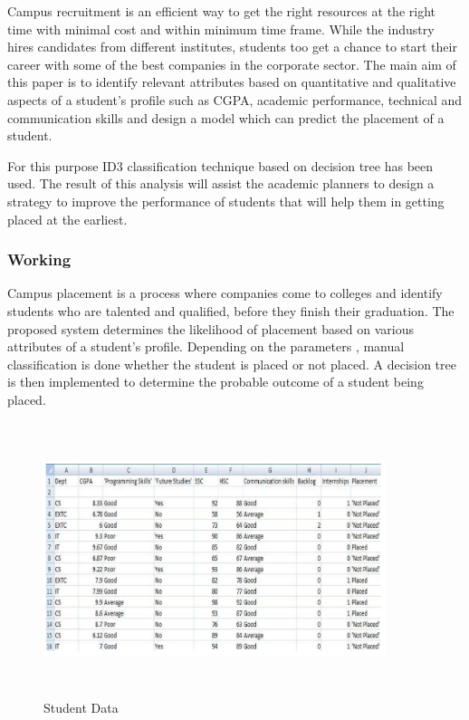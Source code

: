\documentclass[12pt]{article}
\begin{document}
Campus recruitment is an 
efficient way to get the right resources at the right time with 
minimal cost and within minimum time frame. While the 
industry hires candidates from different institutes, students 
too get a chance to start their career with some of the best 
companies in the corporate sector.
The main aim of this paper is to identify relevant attributes based on quantitative and 
qualitative aspects of a student's profile such as CGPA, 
academic performance, technical and communication skills 
and design a model which can predict the placement of a 
student. 

For this purpose ID3 classification technique based 
on decision tree has been used. The result of this analysis will 
assist the academic planners to design a strategy to improve 
the performance of students that will help them in getting 
placed at the earliest.

\newpage
\subsubsection{Working}
Campus placement is a process where companies come 
to colleges and identify students who are talented and 
qualified, before they finish their graduation. The proposed 
system determines the likelihood of placement based on 
various attributes of a student’s profile. Depending on the 
parameters , manual classification is done whether the 
student is placed or not placed. A decision tree is then 
implemented to determine the probable outcome of a 
student being placed.

\begin{figure}[H]
\begin{center}
 \includegraphics[width=10cm, height=8cm]{L2P2}
\caption{Student Data}
\end{center}
\end{figure}
\end{document}
